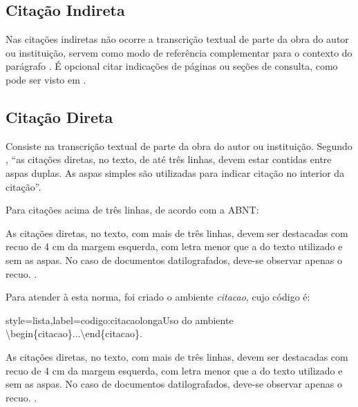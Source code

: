 \subsection{Citação Indireta}

Nas citações indiretas não ocorre a transcrição textual de parte da obra do autor ou instituição, servem como modo de referência complementar para o contexto do parágrafo \cite{NBR10520:2002}. É opcional citar indicações de páginas ou seções de consulta, como pode ser visto em . 

\subsection{Citação Direta}
\label{citacaodireta}
Consiste na transcrição textual de parte da obra do autor ou instituição. Segundo , ``as citações diretas, no texto, de até três linhas, devem estar contidas entre aspas duplas. As aspas simples são utilizadas para indicar citação no interior da citação''. 

Para citações acima de três linhas, de acordo com a ABNT:

\begin{citacao}
As citações diretas, no texto, com mais de três linhas, devem ser destacadas com recuo de 4 cm da margem esquerda,
com letra menor que a do texto utilizado e sem as aspas. No caso de documentos datilografados, deve-se observar
apenas o recuo. \mbox{\cite[p. 2]{NBR10520:2002}.}
\end{citacao}

\noindent
Para atender à esta norma, foi criado o ambiente \emph{citacao}, cujo código é:

\begin{codigo}{style=lista,label={codigo:citacaolonga}}{Uso do ambiente \textbackslash{begin\{citacao\}}...\textbackslash{end\{citacao\}}.}
\begin{citacao}
As citações diretas, no texto, com mais de três linhas, devem ser destacadas com recuo de 4 cm da margem esquerda,
com letra menor que a do texto utilizado e sem as aspas. No caso de documentos datilografados, deve-se observar
apenas o recuo. \mbox{\cite[seção 5.3]{NBR10520:2002}.}
\end{citacao}
\end{codigo}
\label{citacao}

